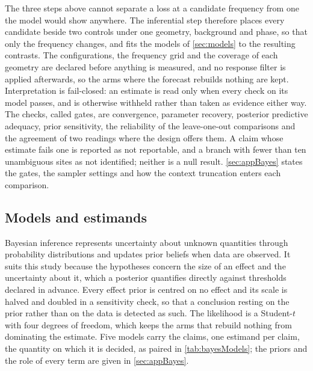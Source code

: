 The three steps above cannot separate a loss at a candidate frequency from one the model would show anywhere. The inferential step therefore places every candidate beside two controls under one geometry, background and phase, so that only the frequency changes, and fits the models of \autoref{sec:models} to the resulting contrasts. The configurations, the frequency grid and the coverage of each geometry are declared before anything is measured, and no response filter is applied afterwards, so the arms where the forecast rebuilds nothing are kept. Interpretation is fail-closed: an estimate is read only when every check on its model passes, and is otherwise withheld rather than taken as evidence either way. The checks, called gates, are convergence, parameter recovery, posterior predictive adequacy, prior sensitivity, the reliability of the leave-one-out comparisons and the agreement of two readings where the design offers them. A claim whose estimate fails one is reported as not reportable, and a branch with fewer than ten unambiguous sites as not identified; neither is a null result\@. \autoref{sec:appBayes} states the gates, the sampler settings and how the context truncation enters each comparison.
\endgroup



\subsection{Models and estimands}\label{sec:models}
Bayesian inference represents uncertainty about unknown quantities through probability distributions and updates prior beliefs when data are observed\autocite{murphyProbabilisticMachineLearning2023}. It suits this study because the hypotheses concern the size of an effect and the uncertainty about it, which a posterior quantifies directly against thresholds declared in advance. Every effect prior is centred on no effect and its scale is halved and doubled in a sensitivity check, so that a conclusion resting on the prior rather than on the data is detected as such. The likelihood is a Student-$t$ with four degrees of freedom, which keeps the arms that rebuild nothing from dominating the estimate. Five models carry the claims, one estimand per claim, the quantity on which it is decided, as paired in \autoref{tab:bayesModels}; the priors and the role of every term are given in \autoref{sec:appBayes}.



\begingroup
\let\subsubsection\paragraph%

